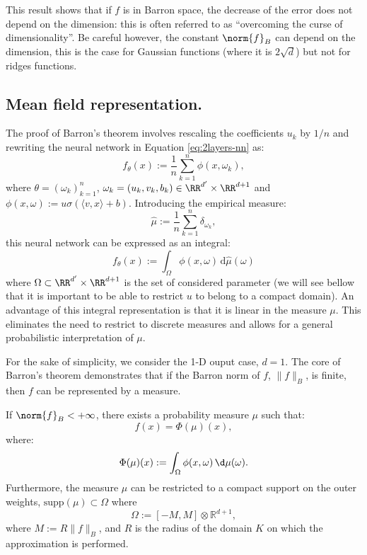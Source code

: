 This result shows that if $f$ is in Barron space, the decrease of the error does not depend on the dimension: this is often referred to as ``overcoming the curse of dimensionality''. Be careful however, the constant $\norm{f}_B$ can depend on the dimension, this is the case for Gaussian functions (where it is $ 2 \sqrt{d}$) but not for ridges functions.




\subsection{Mean field representation.}

The proof of Barron's theorem involves rescaling the coefficients $u_k$ by $1/n$ and rewriting the neural network in Equation \eqref{eq:2layers-nn} as:
\[
	f_\theta(x) := \frac{1}{n} \sum_{k=1}^n \phi(x, \omega_k),
\]
where $\theta = (\omega_k)_{k=1}^n$, $\omega_k = (u_k, v_k, b_k) \in \RR^{d'} \times \RR^{d+1}$ and $\phi(x,\omega) := u \sigma(\langle v, x \rangle + b)$. Introducing the empirical measure:
\[
	\hat{\mu} := \frac{1}{n} \sum_{k=1}^n \delta_{\omega_k},
\]
this neural network can be expressed as an integral:
\[
	f_\theta(x) := \int_\Omega \phi(x, \omega) \, \mathrm{d}\hat{\mu}(\omega)
\]
where $\Omega \subset \RR^{d'} \times \RR^{d+1}$ is the set of considered parameter (we will see bellow that it is important to be able to restrict $u$ to belong to a compact domain).
%
An advantage of this integral representation is that it is linear in the measure $\mu$. This eliminates the need to restrict to discrete measures and allows for a general probabilistic interpretation of $\mu$.

For the sake of simplicity, we consider the 1-D ouput case, $d=1$. 
%
The core of Barron's theorem demonstrates that if the Barron norm of $f$, $\|f\|_B$, is finite, then $f$ can be represented by a measure. 

\begin{prop}
If $\norm{f}_B < +\infty$, there exists a probability measure $\mu$ such that:
\[
f(x) = \Phi(\mu)(x),
\]
where:
\begin{equation}
	\Phi(\mu)(x) := \int_\Omega \phi(x, \omega) \, \d\mu(\omega). \label{eq:existence-measure-radon}
\end{equation}
Furthermore, the measure $\mu$ can be restricted to a compact support on the outer weights, $\mathrm{supp}(\mu) \subset \Omega$ where
\[
	\Omega := [-M, M] \otimes \mathbb{R}^{d+1},
\]
where $M := R \|f\|_B$, and $R$ is the radius of the domain $K$ on which the approximation is performed. 
\end{prop}

